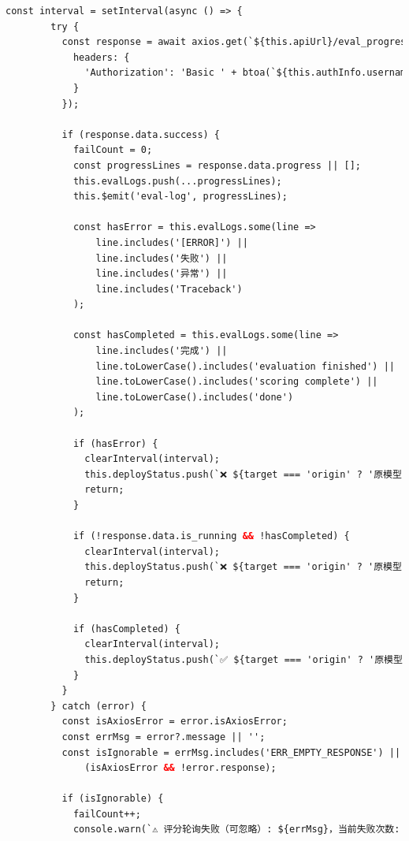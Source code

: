 \documentclass[AutoFakeBold,AutoFakeSlant,language=chinese,degree=bachelor]{sustechthesis}
\begin{document}
\begin{itemize}
\begin{lstlisting}[language=HTML]
      const interval = setInterval(async () => {
        try {
          const response = await axios.get(`${this.apiUrl}/eval_progress`, {
            headers: {
              'Authorization': 'Basic ' + btoa(`${this.authInfo.username}:${this.authInfo.password}`)
            }
          });

          if (response.data.success) {
            failCount = 0;
            const progressLines = response.data.progress || [];
            this.evalLogs.push(...progressLines);
            this.$emit('eval-log', progressLines);

            const hasError = this.evalLogs.some(line =>
                line.includes('[ERROR]') ||
                line.includes('失败') ||
                line.includes('异常') ||
                line.includes('Traceback')
            );

            const hasCompleted = this.evalLogs.some(line =>
                line.includes('完成') ||
                line.toLowerCase().includes('evaluation finished') ||
                line.toLowerCase().includes('scoring complete') ||
                line.toLowerCase().includes('done')
            );

            if (hasError) {
              clearInterval(interval);
              this.deployStatus.push(`❌ ${target === 'origin' ? '原模型' : '量化模型'} 评分失败，请检查日志`);
              return;
            }

            if (!response.data.is_running && !hasCompleted) {
              clearInterval(interval);
              this.deployStatus.push(`❌ ${target === 'origin' ? '原模型' : '量化模型'} 评分中断但未检测到“完成”关键词，可能失败`);
              return;
            }

            if (hasCompleted) {
              clearInterval(interval);
              this.deployStatus.push(`✅ ${target === 'origin' ? '原模型' : '量化模型'} 评分完成`);
            }
          }
        } catch (error) {
          const isAxiosError = error.isAxiosError;
          const errMsg = error?.message || '';
          const isIgnorable = errMsg.includes('ERR_EMPTY_RESPONSE') ||
              (isAxiosError && !error.response);

          if (isIgnorable) {
            failCount++;
            console.warn(`⚠️ 评分轮询失败（可忽略）: ${errMsg}，当前失败次数: ${failCount}`);


\end{lstlisting}
\end{itemize}
\end{document}
